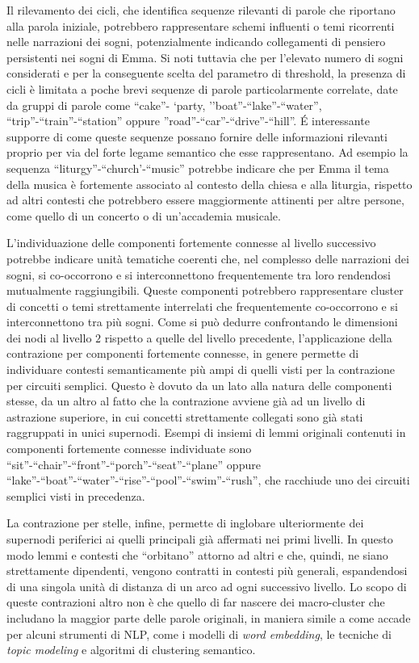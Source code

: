 Il rilevamento dei cicli, che identifica sequenze rilevanti di parole che riportano alla parola iniziale, potrebbero
rappresentare schemi influenti o temi ricorrenti nelle narrazioni dei sogni,
potenzialmente indicando collegamenti di pensiero persistenti nei sogni di Emma.
Si noti tuttavia che per l'elevato numero di sogni considerati e per la conseguente scelta del parametro di threshold,
la presenza di cicli è limitata a poche brevi sequenze di parole particolarmente correlate, date da gruppi di
parole come ``cake''- `party, ''boat''-``lake''-``water'', ``trip''-``train''-``station'' oppure
''road''-``car''-``drive''-``hill''.
\'E interessante supporre di come queste sequenze possano fornire delle informazioni rilevanti proprio per via del forte
legame semantico che esse rappresentano.
Ad esempio la sequenza ``liturgy''-``church'-``music'' potrebbe indicare che per Emma il tema della musica è
fortemente associato al contesto della chiesa e alla liturgia, rispetto ad altri contesti che potrebbero
essere maggiormente attinenti per altre persone, come quello di un concerto o di un'accademia musicale.


L'individuazione delle componenti fortemente connesse al livello successivo potrebbe indicare unità tematiche coerenti
che, nel complesso delle narrazioni dei sogni, si co-occorrono e si interconnettono frequentemente tra loro rendendosi
mutualmente raggiungibili.
Queste componenti potrebbero rappresentare cluster di concetti o temi strettamente
interrelati che frequentemente co-occorrono e si interconnettono tra più sogni.
Come si può dedurre confrontando le dimensioni dei nodi al livello $2$ rispetto a quelle del livello precedente,
l'applicazione della contrazione per componenti fortemente connesse, in genere permette di individuare contesti
semanticamente più ampi di quelli visti per la contrazione per circuiti semplici.
Questo è dovuto da un lato alla natura delle componenti stesse, da un altro al fatto che la contrazione avviene
già ad un livello di astrazione superiore, in cui concetti strettamente collegati sono già stati raggruppati in unici
supernodi.
Esempi di insiemi di lemmi originali contenuti in componenti fortemente connesse individuate sono
``sit''-``chair''-``front''-``porch''-``seat''-``plane''
oppure ``lake''-``boat''-``water''-``rise''-``pool''-``swim''-``rush'', che racchiude uno dei circuiti semplici visti
in precedenza.

La contrazione per stelle, infine, permette di inglobare ulteriormente dei supernodi periferici ai quelli principali già
affermati nei primi livelli.
In questo modo lemmi e contesti che ``orbitano'' attorno ad altri e che, quindi,
ne siano strettamente dipendenti, vengono contratti in contesti più generali, espandendosi di una singola unità
di distanza di un arco ad ogni successivo livello.
Lo scopo di queste contrazioni altro non è che quello di far nascere dei macro-cluster che includano la maggior parte
delle parole originali, in maniera simile a come accade per alcuni strumenti di NLP, come i modelli di
\textit{word embedding}, le tecniche di \textit{topic modeling} e algoritmi di clustering semantico.

